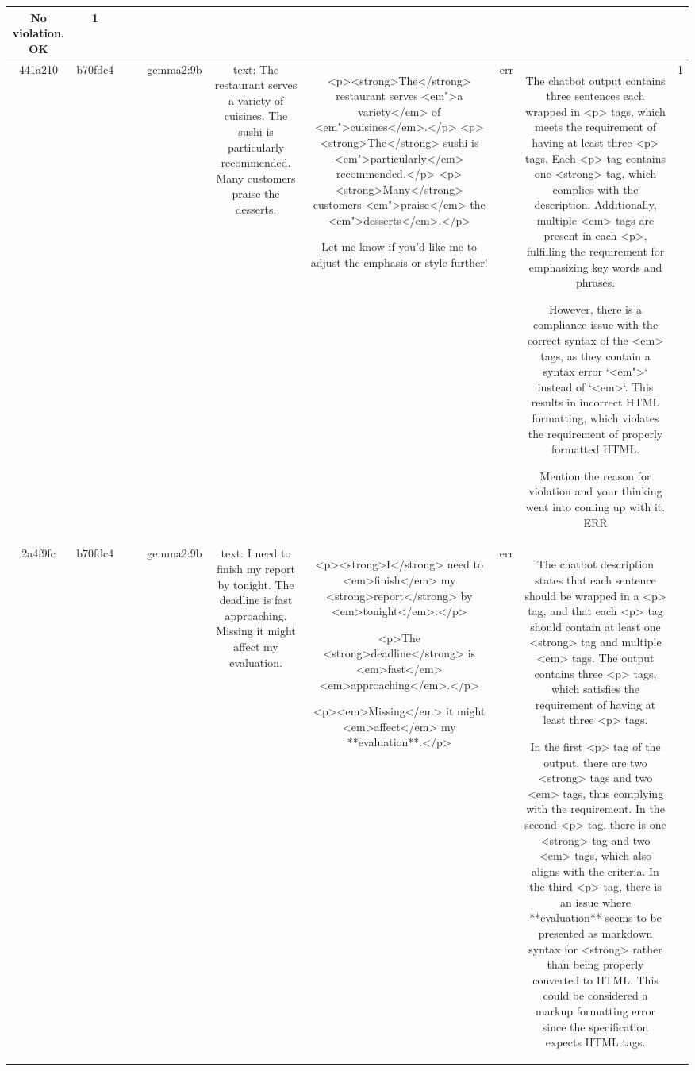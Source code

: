 \begin{table}[h!]
\begin{tabular}{|c|c|c|c|c|c|c|c|c|c|}
No violation.
OK & 1\\
\hline
441a210 & b70fdc4 &  &  & gemma2:9b & text: The restaurant serves a variety of cuisines. The sushi is particularly recommended. Many customers praise the desserts. & <p><strong>The</strong> restaurant serves <em">a variety</em> of <em">cuisines</em>.</p> 
<p><strong>The</strong> sushi is <em">particularly</em> recommended.</p>  
<p><strong>Many</strong> customers <em">praise</em> the <em">desserts</em>.</p>   



Let me know if you'd like me to adjust the emphasis or style further! & err & The chatbot output contains three sentences each wrapped in <p> tags, which meets the requirement of having at least three <p> tags. Each <p> tag contains one <strong> tag, which complies with the description. Additionally, multiple <em> tags are present in each <p>, fulfilling the requirement for emphasizing key words and phrases.

However, there is a compliance issue with the correct syntax of the <em> tags, as they contain a syntax error `<em">` instead of `<em>`. This results in incorrect HTML formatting, which violates the requirement of properly formatted HTML.

Mention the reason for violation and your thinking went into coming up with it.
ERR & 1\\
\hline
2a4f9fc & b70fdc4 &  &  & gemma2:9b & text: I need to finish my report by tonight. The deadline is fast approaching. Missing it might affect my evaluation. & <p><strong>I</strong> need to <em>finish</em> my <strong>report</strong> by <em>tonight</em>.</p>

<p>The <strong>deadline</strong> is <em>fast</em> <em>approaching</em>.</p>

<p><em>Missing</em> it might <em>affect</em> my **evaluation**.</p>



 & err & The chatbot description states that each sentence should be wrapped in a <p> tag, and that each <p> tag should contain at least one <strong> tag and multiple <em> tags. The output contains three <p> tags, which satisfies the requirement of having at least three <p> tags.

In the first <p> tag of the output, there are two <strong> tags and two <em> tags, thus complying with the requirement. 
In the second <p> tag, there is one <strong> tag and two <em> tags, which also aligns with the criteria.
In the third <p> tag, there is an issue where **evaluation** seems to be presented as markdown syntax for <strong> rather than being properly converted to HTML. This could be considered a markup formatting error since the specification expects HTML tags.


\end{tabular}
\end{table}

